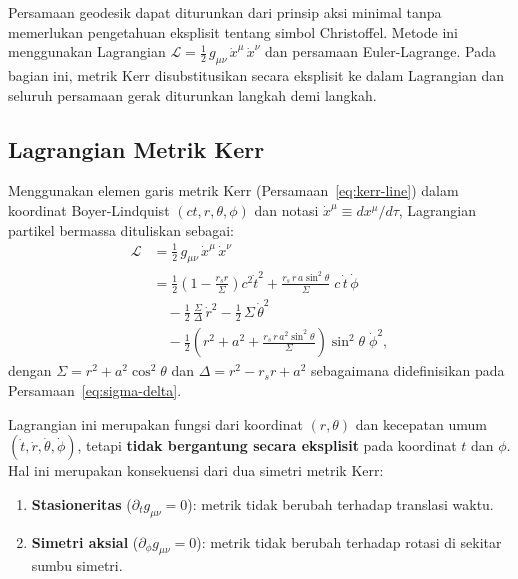Persamaan geodesik dapat diturunkan dari prinsip aksi minimal
tanpa memerlukan pengetahuan eksplisit tentang simbol Christoffel.
Metode ini menggunakan Lagrangian
$\mathcal{L} = \tfrac{1}{2}\,g_{\mu\nu}\,\dot{x}^\mu\,\dot{x}^\nu$
dan persamaan Euler-Lagrange.
Pada bagian ini, metrik Kerr disubstitusikan secara eksplisit ke dalam Lagrangian
dan seluruh persamaan gerak diturunkan langkah demi langkah.


\subsection{Lagrangian Metrik Kerr}
\label{subsec:lagrangian-kerr}

Menggunakan elemen garis metrik Kerr (Persamaan~\ref{eq:kerr-line})
dalam koordinat Boyer-Lindquist $(ct, r, \theta, \phi)$
dan notasi $\dot{x}^\mu \equiv dx^\mu / d\tau$,
Lagrangian partikel bermassa dituliskan sebagai:
\begin{equation}
\boxed{
\begin{aligned}
    \mathcal{L}
    &= \frac{1}{2}\,g_{\mu\nu}\,\dot{x}^\mu\,\dot{x}^\nu \\[6pt]
    &= \frac{1}{2}\left(1 - \frac{r_s r}{\Sigma}\right) c^2\dot{t}^2
     + \frac{r_s\, r\, a\sin^2\!\theta}{\Sigma}\; c\,\dot{t}\,\dot{\phi} \\[4pt]
    &\quad - \frac{1}{2}\,\frac{\Sigma}{\Delta}\,\dot{r}^2
     - \frac{1}{2}\,\Sigma\,\dot{\theta}^2 \\[4pt]
    &\quad - \frac{1}{2}\left(r^2 + a^2
     + \frac{r_s\, r\, a^2\sin^2\!\theta}{\Sigma}\right)\sin^2\!\theta\;\dot{\phi}^2,
\end{aligned}
}
    \label{eq:lagrangian-kerr}
\end{equation}
dengan $\Sigma = r^2 + a^2\cos^2\!\theta$
dan $\Delta = r^2 - r_s r + a^2$ sebagaimana didefinisikan
pada Persamaan~\eqref{eq:sigma-delta}.

Lagrangian ini merupakan fungsi dari koordinat $(r, \theta)$
dan kecepatan umum $(\dot{t}, \dot{r}, \dot{\theta}, \dot{\phi})$,
tetapi \textbf{tidak bergantung secara eksplisit} pada koordinat $t$ dan $\phi$.
Hal ini merupakan konsekuensi dari dua simetri metrik Kerr:
\begin{enumerate}[label=(\roman*)]
    \item \textbf{Stasioneritas} ($\partial_t g_{\mu\nu} = 0$):
          metrik tidak berubah terhadap translasi waktu.
    \item \textbf{Simetri aksial} ($\partial_\phi g_{\mu\nu} = 0$):
          metrik tidak berubah terhadap rotasi di sekitar sumbu simetri.
\end{enumerate}


